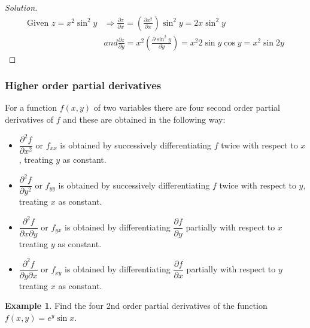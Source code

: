 \documentclass[../../main.tex]{subfiles}
\theoremstyle{definition}
\newtheorem{example}{Example}[section]
\newenvironment{solution}
    {\begin{proof}[Solution]}
    {\end{proof}}
\begin{document}
\begin{solution}
\begin{align*}
    \text{Given } z=x^2\sin^2 y &\Rightarrow \frac{\partial z}{\partial x}= (\frac{\partial x^2}{\partial x})\sin^2 y=2x\sin^2 y \\    
    &and  \frac{\partial z}{\partial y}= x^2(\frac{\partial \sin^2 y}{\partial y})=x^2 2\sin y\cos y=x^2\sin 2y
\end{align*}
\end{solution}

\subsubsection{Higher order partial derivatives}

For a function $f(x,y)$ of two variables there are four second order partial derivatives of $f$ and these are obtained in the following way:

\begin{itemize}
    \item $\dfrac{\partial^2f}{\partial x^2}$ or $f_{xx}$ is obtained by successively differentiating $f$ twice with respect to $x$, treating $y$ as constant.

    \item $\dfrac{\partial^2f}{\partial y^2}$ or $f_{yy}$ is obtained by successively differentiating $f$ twice with respect to $y$, treating $x$ as constant.

    \item $\dfrac{\partial^2f}{\partial x\partial y}$ or $f_{yx}$ is obtained by differentiating $\dfrac{\partial f}{\partial y}$ partially with respect to $x$ treating $y$ as constant.

    \item $\dfrac{\partial^2f}{\partial y\partial x}$ or $f_{xy}$ is obtained by differentiating $\dfrac{\partial f}{\partial x}$ partially with respect to $y$ treating $x$ as constant.
\end{itemize}

\begin{example}
Find the four 2nd order partial derivatives of the function $f(x,y)=e^y\sin x$.    
\end{example}
\end{document}
